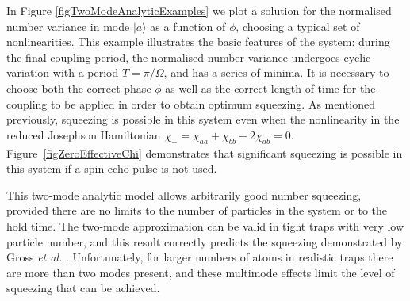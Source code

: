 \documentclass{iopart}
\begin{document}



In Figure \ref{figTwoModeAnalyticExamples} we plot a solution for the normalised number variance in mode $|a\rangle$ as a function of $\phi$, choosing a typical set of nonlinearities. This example illustrates the basic features of the system: during the final coupling period, the normalised number variance undergoes cyclic variation with a period $T=\pi / \Omega$, and has a series of minima. It is necessary to choose both the correct phase $\phi$ as well as the correct length of time for the coupling to be applied in order to obtain optimum squeezing.  As mentioned previously, squeezing is possible in this system even when the nonlinearity in the reduced Josephson Hamiltonian $\chi_+=\chi_{aa} + \chi_{bb} - 2\chi_{ab} = 0$.  Figure~\ref{figZeroEffectiveChi} demonstrates that significant squeezing is possible in this system if a spin-echo pulse is not used.

This two-mode analytic model allows arbitrarily good number squeezing, provided there are no limits to the number of particles in the system or to the hold time. The two-mode approximation can be valid in tight traps with very low particle number, and this result correctly predicts the squeezing demonstrated by Gross \textit{et al.} \cite{gross2010}. Unfortunately, for larger numbers of atoms in realistic traps there are more than two modes present, and these multimode effects limit the level of squeezing that can be achieved.
\end{document}
